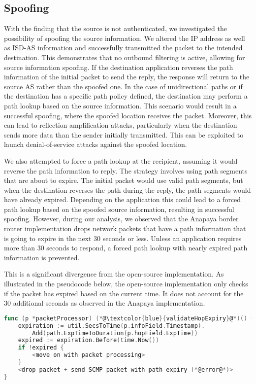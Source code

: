\subsection{Spoofing}
\label{sec:spoofing}
With the finding that the source is not authenticated, we investigated the possibility of spoofing the source information.
We altered the IP address as well as ISD-AS information and successfully transmitted the packet to the intended destination.
This demonstrates that no outbound filtering is active, allowing for source information spoofing.
If the destination application reverses the path information of the initial packet to send the reply, the response will return to the source AS rather than the spoofed one.
In the case of unidirectional paths or if the destination has a specific path policy defined, the destination may perform a path lookup based on the source information.
This scenario would result in a successful spoofing, where the spoofed location receives the packet.
Moreover, this can lead to reflection amplification attacks, particularly when the destination sends more data than the sender initially transmitted.
This can be exploited to launch denial-of-service attacks against the spoofed location.

We also attempted to force a path lookup at the recipient, assuming it would reverse the path information to reply.
The strategy involves using path segments that are about to expire.
The initial packet would use valid path segments, but when the destination reverses the path during the reply, the path segments would have already expired.
Depending on the application this could lead to a forced path lookup based on the spoofed source information, resulting in successful spoofing.
However, during our analysis, we observed that the Anapaya border router implementation drops network packets that have a path information that is going to expire in the next 30 seconds or less.
Unless an application requires more than 30 seconds to respond, a forced path lookup with nearly expired path information is prevented.

This is a significant divergence from the open-source implementation.
As illustrated in the pseudocode below, the open-source implementation only checks if the packet has expired based on the current time.
It does not account for the 30 additional seconds as observed in the Anapaya implementation.


\begin{lstlisting}[language={Go}, morekeywords={}, caption={Pseudocode of hop expiry check in open-source implementation of the border router.}, label={lst:hop-expiry}]
func (p *packetProcessor) (*@\textcolor{blue}{validateHopExpiry}@*)() (processResult, error) {
    expiration := util.SecsToTime(p.infoField.Timestamp).
        Add(path.ExpTimeToDuration(p.hopField.ExpTime))
    expired := expiration.Before(time.Now())
    if !expired {
        <move on with packet processing>
    }
    <drop packet + send SCMP packet with path expiry (*@error@*)>
}
\end{lstlisting}


